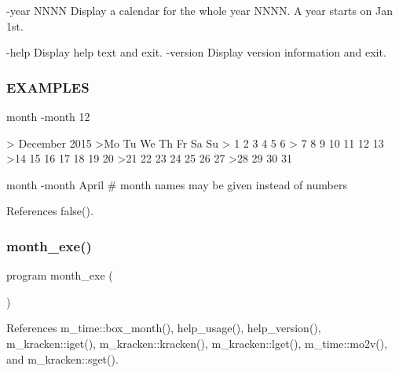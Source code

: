 -\/year N\+N\+NN Display a calendar for the whole year N\+N\+NN. A year starts on Jan 1st.

-\/help Display help text and exit. -\/version Display version information and exit.

\subsubsection*{E\+X\+A\+M\+P\+L\+ES}

\begin{DoxyVerb}   month -month 12

    >    December 2015
    >Mo Tu We Th Fr Sa Su
    >    1  2  3  4  5  6
    > 7  8  9 10 11 12 13
    >14 15 16 17 18 19 20
    >21 22 23 24 25 26 27
    >28 29 30 31

   month -month April # month names may be given instead of numbers \end{DoxyVerb}
 

References false().

\mbox{\label{month_8f90_a25f7e0d0c91977505b956237e747f2bb}} 
\subsubsection{\texorpdfstring{month\+\_\+exe()}{month\_exe()}}
{\footnotesize\ttfamily program month\+\_\+exe (\begin{DoxyParamCaption}{ }\end{DoxyParamCaption})}



References m\+\_\+time\+::box\+\_\+month(), help\+\_\+usage(), help\+\_\+version(), m\+\_\+kracken\+::iget(), m\+\_\+kracken\+::kracken(), m\+\_\+kracken\+::lget(), m\+\_\+time\+::mo2v(), and m\+\_\+kracken\+::sget().

